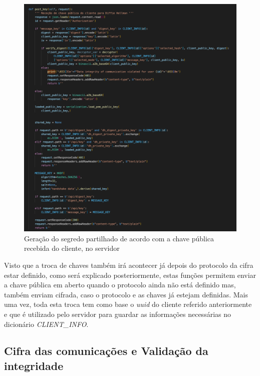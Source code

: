\documentclass[10pt,english]{article}
\begin{document}
\begin{figure}[!h]
        \centering
        \includegraphics[width=\textwidth]{images/dh_get_server.png}
        \caption{Geração do segredo partilhado de acordo com a chave pública recebida do cliente, no servidor}
\end{figure}

\clearpage

\par Visto que a troca de chaves também irá acontecer já depois do protocolo da cifra estar definido, como será explicado posteriormente, estas funções permitem enviar a chave pública em aberto quando o protocolo ainda não está definido mas, também enviam cifrada, caso o protocolo e as chaves já estejam definidas. Mais uma vez, toda esta troca tem como base o \textit{uuid} do cliente referido anteriormente e que é utilizado pelo servidor para guardar as informações necessárias no dicionário \textit{CLIENT\_INFO}.



\subsection{Cifra das comunicações e Validação da integridade}
\end{document}
